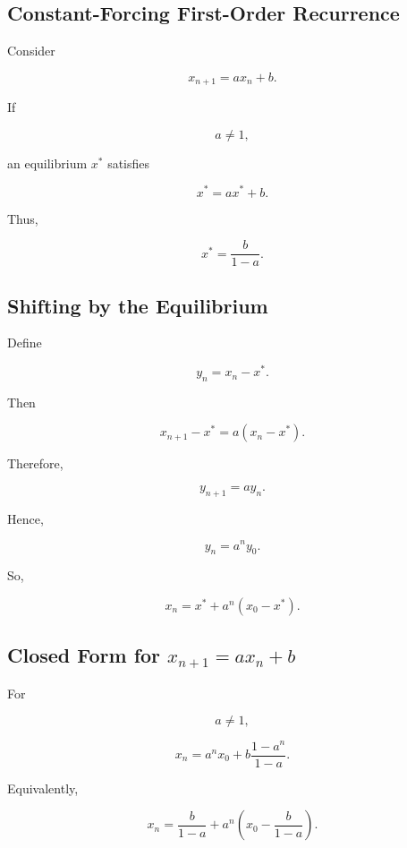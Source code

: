 \subsection{Constant-Forcing First-Order Recurrence}
\label{subsec:first-order-constant-forcing}

Consider

\[
\boxed{
x_{n+1}=ax_n+b.
}
\]

If

\[
a\neq1,
\]

an equilibrium \(x^*\) satisfies

\[
x^*=ax^*+b.
\]

Thus,

\[
\boxed{
x^*
=
\frac{b}{1-a}.
}
\]

\subsection{Shifting by the Equilibrium}
\label{subsec:equilibrium-shift-recurrence}

Define

\[
\boxed{
y_n
=
x_n-x^*.
}
\]

Then

\[
x_{n+1}-x^*
=
a(x_n-x^*).
\]

Therefore,

\[
\boxed{
y_{n+1}=ay_n.
}
\]

Hence,

\[
\boxed{
y_n=a^ny_0.
}
\]

So,

\[
\boxed{
x_n
=
x^*
+
a^n(x_0-x^*).
}
\]

\subsection{Closed Form for \(x_{n+1}=ax_n+b\)}
\label{subsec:first-order-affine-closed-form}

For

\[
a\neq1,
\]

\[
\boxed{
x_n
=
a^nx_0
+
b
\frac{
1-a^n
}{
1-a
}.
}
\]

Equivalently,

\[
\boxed{
x_n
=
\frac{b}{1-a}
+
a^n
\left(
x_0-\frac{b}{1-a}
\right).
}
\]

